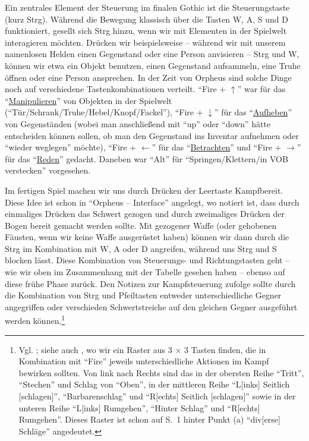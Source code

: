 \documentclass[a5paper,pagesize,numbers=noenddot]{scrbook}
\begin{document}
Ein zentrales Element der Steuerung im finalen Gothic ist die Steuerungstaste (kurz Strg).
Während die Bewegung klassisch über die Tasten W, A, S und D funktioniert, gesellt sich Strg hinzu, wenn wir mit Elementen in der Spielwelt interagieren möchten.
Drücken wir beispielsweise -- während wir mit unserem namenlosen Helden einen Gegenstand oder eine Person anvisieren -- Strg und W, können wir etwa ein Objekt benutzen, einen Gegenstand aufsammeln, eine Truhe öffnen oder eine Person ansprechen.
In der Zeit von Orpheus sind solche Dinge noch auf verschiedene Tastenkombinationen verteilt.
\enquote{Fire + $\uparrow$} war für das \enquote{\uline{Manipulieren}} von Objekten in der Spielwelt (\enquote{Tür/Schrank/Truhe/Hebel/Knopf/Fackel}), \enquote{Fire + $\downarrow$} für das \enquote{\uline{Aufheben}} von Gegenständen (wobei man anschließend mit \enquote{up} oder \enquote{down} hätte entscheiden können sollen, ob man den Gegenstand ins Inventar aufnehmen oder \enquote{wieder weglegen} möchte), \enquote{Fire + $\leftarrow$} für das \enquote{\uline{Betrachten}} und \enquote{Fire + $\rightarrow$} für das \enquote{\uline{Reden}} gedacht.\autocite[S.~2]{orpheus_interface}
Daneben war \enquote{Alt} für \enquote{Springen/Klettern/in VOB verstecken} vorgesehen.\autocite[S.~3]{orpheus_interface}

Im fertigen Spiel machen wir uns durch Drücken der Leertaste Kampfbereit.
Diese Idee ist schon in \enquote{Orpheus -- Interface} angelegt, wo notiert ist, dass durch einmaliges Drücken das Schwert gezogen und durch zweimaliges Drücken der Bogen bereit gemacht werden sollte.\autocite[S.~2]{orpheus_interface}
Mit gezogener Waffe (oder gehobenen Fäusten, wenn wir keine Waffe ausgerüstet haben) können wir dann durch die Strg im Kombination mit W, A oder D angreifen, während uns Strg und S blocken lässt.
Diese Kombination von Steuerungs- und Richtungstasten geht -- wie wir oben im Zusammenhang mit der Tabelle gesehen haben -- ebenso auf diese frühe Phase zurück.
Den Notizen zur Kampfsteuerung zufolge sollte durch die Kombination von Strg und Pfeiltasten entweder unterschiedliche Gegner angegriffen oder verschieden Schwertstreiche auf den gleichen Gegner ausgeführt werden können.\footnote{Vgl. \autocite[S.~1--3]{orpheus_kampfsteuerung}; siehe auch \autocite[S.~4]{orpheus_interface}, wo wir ein Raster aus 3 × 3 Tasten finden, die in Kombination mit \enquote{Fire} jeweils unterschiedliche Aktionen im Kampf bewirken sollten. Von link nach Rechts sind das in der obersten Reihe \enquote{Tritt}, \enquote{Stechen} und Schlag von \enquote{Oben}, in der mittleren Reihe \enquote{L[inks] Seitlich [schlagen]}, \enquote{Barbarenschlag} und \enquote{R[echts] Seitlich [schlagen]} sowie in der unteren Reihe \enquote{L[inks] Rumgehen}, \enquote{Hinter Schlag} und \enquote{R[echts] Rumgehen}. Dieses Raster ist schon auf S.~1 hinter Punkt (a) \enquote{div[erse] Schläge} angedeutet.}
\end{document}
